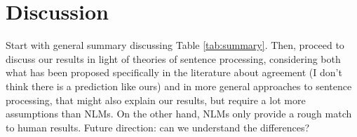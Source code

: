 \section{Discussion}
\label{sec:discussion}


Start with general summary discussing Table \ref{tab:summary}.  Then,
proceed to discuss our results in light of theories of sentence
processing, considering both what has been proposed specifically in
the literature about agreement (I don't think there is a prediction
like ours) and in more general approaches to sentence processing, that
might also explain our results, but require a lot more assumptions
than NLMs. On the other hand, NLMs only provide a
rough match to human results. Future direction: can we understand
the differences?
